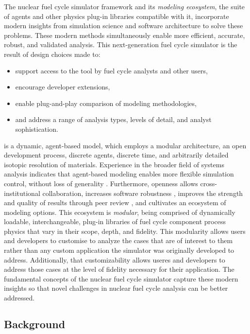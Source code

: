 The \Cyclus nuclear fuel cycle simulator framework and its \emph{modeling
ecosystem}, the suite of agents and other physics plug-in libraries compatible with it,
incorporate modern insights from simulation science and software architecture
to solve these problems.  These modern methods simultaneously enable more
efficient, accurate, robust, and validated analysis.  This next-generation fuel
cycle simulator is the result of design choices made to:

\begin{itemize}
\item support access to the tool by fuel cycle analysts and other users,
\item encourage developer extensions,
\item enable plug-and-play comparison of modeling methodologies,
\item and address a range of analysis types, levels of detail, and analyst sophistication.
\end{itemize}

\Cyclus is a dynamic, agent-based model, which employs a modular architecture,
an open development process, discrete agents, discrete time, and arbitrarily
detailed isotopic resolution of materials. Experience in the broader field of
systems analysis indicates that agent-based modeling enables more flexible
simulation control, without loss of generality
\cite{macal_agent-based_2010}. Furthermore, openness allows cross-institutional
collaboration, increases software robustness
\cite{cohen_modern_2010,fagan_design_2002,petre_code_2014}, improves
the strength and quality of results through peer review
\cite{ince_case_2012,stodden_scientific_2010,wicherts_willingness_2011}, and
cultivates an ecosystem of modeling options. This ecosystem is \emph{modular},
being comprised of dynamically loadable, interchangeable, plug-in libraries of fuel cycle component
process physics that vary in their scope, depth, and fidelity. This modularity
allows users and developers to customise \Cyclus to analyze the cases that are
of interest to them rather than any custom application the simulator was
originally developed to address. Additionally, that customizability allows
useres and developers to address those cases at the level of fidelity necessary
for their application. The fundamental concepts of the \Cyclus
nuclear fuel cycle simulator capture these modern insights so that novel
challenges in nuclear fuel cycle analysis can be better addressed.

\subsection{Background}

